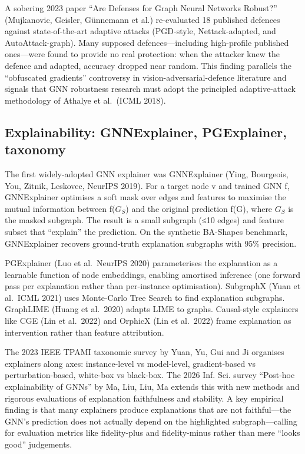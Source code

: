 A sobering 2023 paper ``Are Defenses for Graph Neural Networks Robust?'' (Mujkanovic, Geisler, Günnemann et al.) re-evaluated 18 published defences against state-of-the-art adaptive attacks (PGD-style, Nettack-adapted, and AutoAttack-graph). Many supposed defences---including high-profile published ones---were found to provide no real protection: when the attacker knew the defence and adapted, accuracy dropped near random. This finding parallels the ``obfuscated gradients'' controversy in vision-adversarial-defence literature and signals that GNN robustness research must adopt the principled adaptive-attack methodology of Athalye et al.~(ICML 2018).

\subsection{Explainability: GNNExplainer, PGExplainer, taxonomy}\label{explainability-gnnexplainer-pgexplainer-taxonomy}

The first widely-adopted GNN explainer was GNNExplainer (Ying, Bourgeois, You, Zitnik, Leskovec, NeurIPS 2019). For a target node v and trained GNN f, GNNExplainer optimises a soft mask over edges and features to maximise the mutual information between f(\(G_S\)) and the original prediction f(G), where \(G_S\) is the masked subgraph. The result is a small subgraph (≤10 edges) and feature subset that ``explain'' the prediction. On the synthetic BA-Shapes benchmark, GNNExplainer recovers ground-truth explanation subgraphs with 95\% precision.

PGExplainer (Luo et al.~NeurIPS 2020) parameterises the explanation as a learnable function of node embeddings, enabling amortised inference (one forward pass per explanation rather than per-instance optimisation). SubgraphX (Yuan et al.~ICML 2021) uses Monte-Carlo Tree Search to find explanation subgraphs. GraphLIME (Huang et al.~2020) adapts LIME to graphs. Causal-style explainers like CGE (Lin et al.~2022) and OrphicX (Lin et al.~2022) frame explanation as intervention rather than feature attribution.

The 2023 IEEE TPAMI taxonomic survey by Yuan, Yu, Gui and Ji organises explainers along axes: instance-level vs model-level, gradient-based vs perturbation-based, white-box vs black-box. The 2026 Inf. Sci. survey ``Post-hoc explainability of GNNs'' by Ma, Liu, Liu, Ma extends this with new methods and rigorous evaluations of explanation faithfulness and stability. A key empirical finding is that many explainers produce explanations that are not faithful---the GNN's prediction does not actually depend on the highlighted subgraph---calling for evaluation metrics like fidelity-plus and fidelity-minus rather than mere ``looks good'' judgements.

